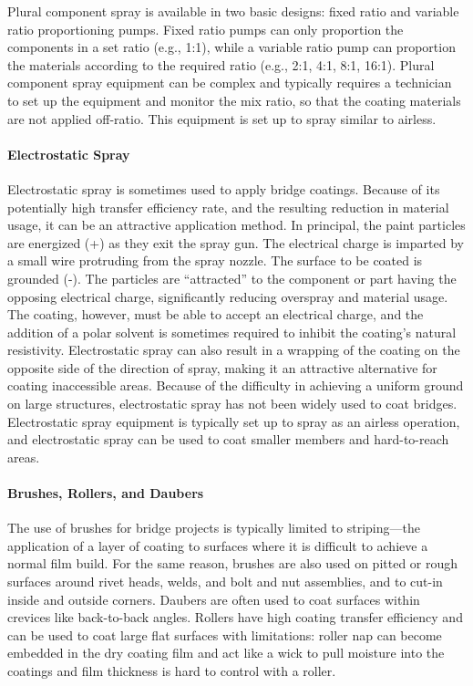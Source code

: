 Plural component spray is available in two basic designs: fixed ratio and variable ratio proportioning pumps.
Fixed ratio pumps can only proportion the components in a set ratio (e.g., 1:1), while a variable ratio pump can
proportion the materials according to the required ratio (e.g., 2:1, 4:1, 8:1, 16:1). Plural component spray equipment
can be complex and typically requires a technician to set up the equipment and monitor the mix ratio, so that the
coating materials are not applied off-ratio. This equipment is set up to spray similar to airless.

\paragraph{Electrostatic Spray}
Electrostatic spray is sometimes used to apply bridge coatings. Because of its potentially high transfer efficiency
rate, and the resulting reduction in material usage, it can be an attractive application method. In principal, the paint
particles are energized (+) as they exit the spray gun. The electrical charge is imparted by a small wire protruding
from the spray nozzle. The surface to be coated is grounded (-). The particles are “attracted” to the component or part
having the opposing electrical charge, significantly reducing overspray and material usage. The coating, however,
must be able to accept an electrical charge, and the addition of a polar solvent is sometimes required to inhibit the
coating’s natural resistivity. Electrostatic spray can also result in a wrapping of the coating on the opposite side of the
direction of spray, making it an attractive alternative for coating inaccessible areas. Because of the difficulty in
achieving a uniform ground on large structures, electrostatic spray has not been widely used to coat bridges.
Electrostatic spray equipment is typically set up to spray as an airless operation, and electrostatic spray can be used to
coat smaller members and hard-to-reach areas.

\paragraph{Brushes, Rollers, and Daubers}
The use of brushes for bridge projects is typically limited to striping—the application of a layer of coating to
surfaces where it is difficult to achieve a normal film build. For the same reason, brushes are also used on pitted or
rough surfaces around rivet heads, welds, and bolt and nut assemblies, and to cut-in inside and outside corners.
Daubers are often used to coat surfaces within crevices like back-to-back angles. Rollers have high coating transfer
efficiency and can be used to coat large flat surfaces with limitations: roller nap can become embedded in the dry
coating film and act like a wick to pull moisture into the coatings and film thickness is hard to control with a roller.

